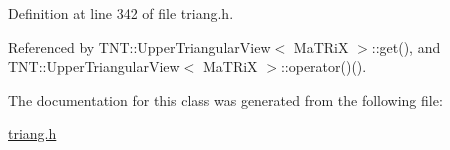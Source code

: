 Definition at line 342 of file triang.h.



Referenced by TNT::UpperTriangularView$<$ MaTRiX $>$::get(), and TNT::UpperTriangularView$<$ MaTRiX $>$::operator()().



The documentation for this class was generated from the following file:\begin{DoxyCompactItemize}
\item 
\hyperlink{triang_8h}{triang.h}\end{DoxyCompactItemize}
